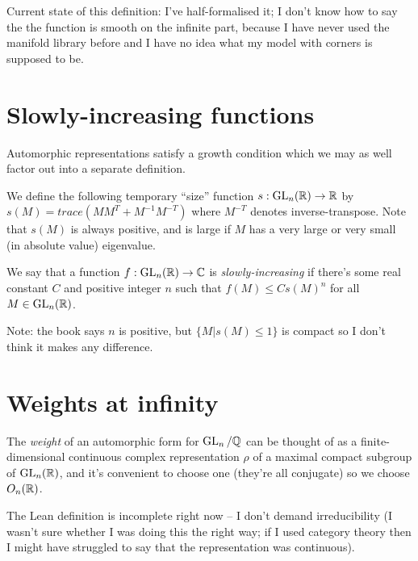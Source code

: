 Current state of this definition: I've half-formalised it; I don't know how to say the the
function is smooth on the infinite part, because I have never used the manifold library before
and I have no idea what my model with corners is supposed to be.

\section{Slowly-increasing functions}

Automorphic representations satisfy a growth condition which we may as well factor out
into a separate definition.

We define the following temporary ``size'' function $s:\operatorname{GL}_n(\mathbb{R})\to\mathbb{R}$ by
$s(M)=trace(MM^T+M^{-1}M^{-T})$ where $M^{-T}$ denotes inverse-transpose. Note that
$s(M)$ is always positive, and is large if $M$ has a very large or very small
(in absolute value) eigenvalue.

\begin{definition}
  \label{AutomorphicForm.GLn.IsSlowlyIncreasing}
  \leanok
  We say that a function $f:\operatorname{GL}_n(\mathbb{R})\to\mathbb{C}$ is \emph{slowly-increasing}
  if there's some real constant $C$ and positive integer $n$ such that $f(M)\leq Cs(M)^n$
  for all $M\in\operatorname{GL}_n(\mathbb{R})$.
\end{definition}

Note: the book says $n$ is positive, but $\{M|s(M)\leq 1\}$ is compact so I don't
think it makes any difference.

\section{Weights at infinity}

\begin{definition}
  \label{AutomorphicForm.GLn.weight}

The \emph{weight} of an automorphic form for $\operatorname{GL}_n/\mathbb{Q}$ can be thought of as a finite-dimensional
continuous complex representation $\rho$ of a maximal compact subgroup of $\operatorname{GL}_n(\mathbb{R})$,
and it's convenient to choose one (they're all conjugate) so we choose $O_n(\mathbb{R})$.
\end{definition}

The Lean definition is incomplete right now -- I don't demand irreducibility
(I wasn't sure whether I was doing this the right way; if I used category theory
then I might have struggled to say that the representation was continuous).


